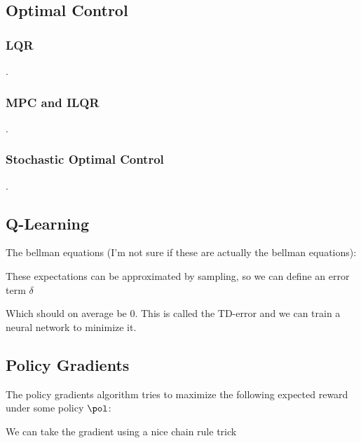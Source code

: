 \documentclass[12pt]{article}
\begin{document}
\subsection{Optimal Control}

\subsubsection{LQR}
.
\subsubsection{MPC and ILQR}
.
\subsubsection{Stochastic Optimal Control}
.
\subsection{Q-Learning}

The bellman equations (I'm not sure if these are actually the bellman equations):


These expectations can be approximated by sampling, so we can define an error term $\delta$


Which should on average be 0. This is called the TD-error and we can train a neural network to minimize it.

\subsection{Policy Gradients}

The policy gradients algorithm tries to maximize the following expected reward under some policy $\pol$:


We can take the gradient using a nice chain rule trick

\end{document}
